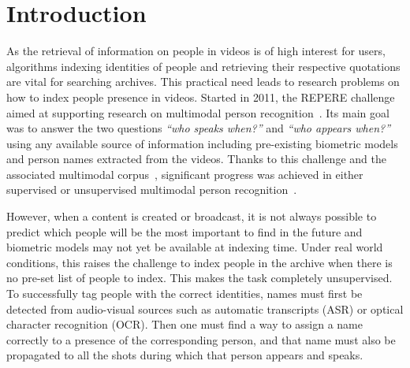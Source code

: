 \section{Introduction}

As the retrieval of information on people in videos is of high interest for users, algorithms indexing identities of people and retrieving their respective quotations are vital for searching archives. This practical need leads to research problems on how to index people presence in videos.
%
%
%
Started in 2011, the REPERE challenge aimed at supporting research on multimodal person recognition~\cite{BERNARD--SLAM--2013, GIRAUDEL--LREC--2012}. Its main goal was to answer the two questions \emph{``who speaks when?''} and \emph{``who appears when?''} using any available source of information including pre-existing biometric models and person names extracted from the videos.
%
Thanks to this challenge and the associated multimodal corpus~\cite{GIRAUDEL--LREC--2012}, significant progress was achieved in either supervised or unsupervised multimodal person recognition~\cite{BECHET--INTERSPEECH--2014, BREDIN--IJMIR--2014, GAY--CBMI--2014, poignant2012fusion, ROUVIER--CBMI--2014}.

However, when a content is created or broadcast, it is not always possible to predict which people will be the most important to find in the future and biometric models may not yet be available at indexing time.
%
Under real world conditions, this raises the challenge to index people in the archive when there is no pre-set list of people to index.
%
This makes the task completely unsupervised.
%
To successfully tag people with the correct identities, names must first be detected from audio-visual sources such as automatic transcripts (ASR) or optical character recognition (OCR).
%
Then one must find a way to assign a name correctly to a presence of the corresponding person, and that name must also be propagated to all the shots during which that person appears and speaks. 
%

